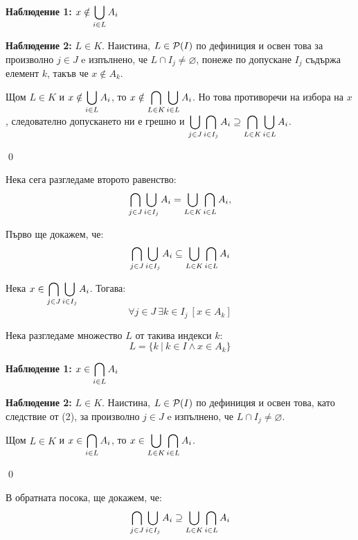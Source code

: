\begin{problem}
\begin{tcolorbox}[mybox={Доказателство:}]
\quad
\textbf{Наблюдение 1:} $\displaystyle x \notin \bigcup_{i \in L} A_i$

\quad
\textbf{Наблюдение 2:} $L \in K$.
Наистина, $L \in \mathcal{P}(I)$ по дефиниция и освен това за произволно $j \in J$ e изпълнено, че $L \cap I_j \neq \varnothing$,
понеже по допускане $I_j$ съдържа елемент $k$, такъв че $x \notin A_k$.

\bigbreak
\quad
Щом $L \in K$ и $\displaystyle x \notin \bigcup_{i \in L} A_i$, то
$\displaystyle x \notin \bigcap_{L \in K} \bigcup_{i \in L} A_i$.
Но това противоречи на избора на $x$, следователно допускането ни е грешно и
$\displaystyle \bigcup_{j \in J} \bigcap_{i \in I_j} A_i \supseteq \bigcap_{L \in K} \bigcup_{i \in L} A_i$.

\qed
\end{tcolorbox}

\bigbreak
\quad
Нека сега разгледаме второто равенство:
\[
\bigcap_{j \in J} \bigcup_{i \in I_j} A_i = \bigcup_{L \in K} \bigcap_{i \in L} A_i,
\]

\quad
Първо ще докажем, че:
\[
\bigcap_{j \in J} \bigcup_{i \in I_j} A_i \subseteq \bigcup_{L \in K} \bigcap_{i \in L} A_i
\]

\begin{tcolorbox}[mybox={Доказателство:}]
\quad
Нека
$\displaystyle x \in \bigcap_{j \in J} \bigcup_{i \in I_j} A_i$.
Тогава:
\begin{equation}
\forall j \in J \ \exists k \in I_j\ [x \in A_k]
\end{equation}

\quad
Нека разгледаме множество $L$ от такива индекси $k$:
\[
L = \{k \ |\ k \in I \land x \in A_k\}
\]

\quad
\textbf{Наблюдение 1:} $\displaystyle x \in \bigcap_{i \in L} A_i$

\quad
\textbf{Наблюдение 2:} $L \in K$.
Наистина, $L \in \mathcal{P}(I)$ по дефиниция и освен това, като следствие от (2),
за произволно $j \in J$ e изпълнено, че $L \cap I_j \neq \varnothing$.

\bigbreak
\quad
Щом $L \in K$ и $\displaystyle x \in \bigcap_{i \in L} A_i$, то
$\displaystyle x \in \bigcup_{L \in K} \bigcap_{i \in L} A_i$.

\qed
\end{tcolorbox}

\bigbreak
\quad
В обратната посока, ще докажем, че:
\[
\bigcap_{j \in J} \bigcup_{i \in I_j} A_i \supseteq \bigcup_{L \in K} \bigcap_{i \in L} A_i
\]


\end{problem}
